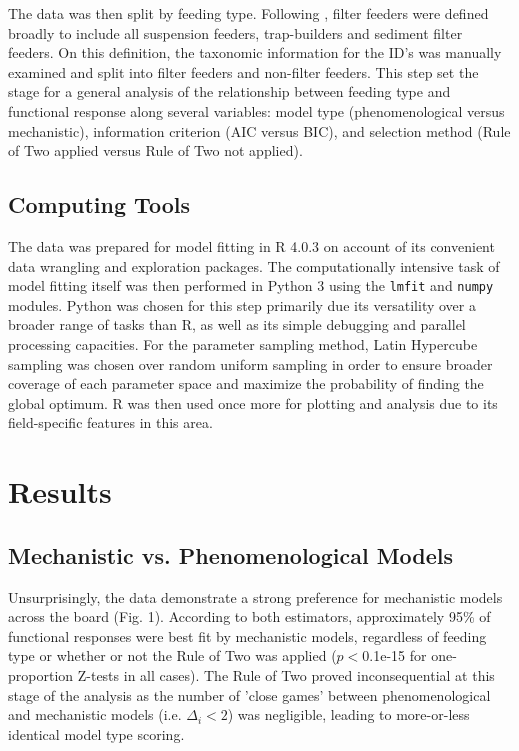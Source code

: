 \documentclass[11pt]{article}
\begin{document}
    The data was then split by feeding type. Following \citet{jeschke2004consumer}, filter feeders were defined broadly to include all suspension feeders, trap-builders and sediment filter feeders. On this definition, the taxonomic information for the ID's was manually examined and split into filter feeders and non-filter feeders. This step set the stage for a general analysis of the relationship between feeding type and functional response along several variables: model type (phenomenological versus mechanistic), information criterion (AIC versus BIC), and selection method (Rule of Two applied versus Rule of Two not applied). 
    
    \subsection{Computing Tools}
    
    The data was prepared for model fitting in R 4.0.3 on account of its convenient data wrangling and exploration packages. The computationally intensive task of model fitting itself was then performed in Python 3 using the \texttt{lmfit} and \texttt{numpy} modules. Python was chosen for this step primarily due its versatility over a broader range of tasks than R, as well as its simple debugging and parallel processing capacities. For the parameter sampling method, Latin Hypercube sampling was chosen over random uniform sampling in order to ensure broader coverage of each parameter space and maximize the probability of finding the global optimum. 
    R was then used once more for plotting and analysis due to its field-specific features in this area.

    
    \section{Results}
    \subsection{Mechanistic vs. Phenomenological Models}
    
    Unsurprisingly, the data demonstrate a strong preference for mechanistic models across the board (Fig. 1). According to both estimators, approximately 95\% of functional responses were best fit by mechanistic models, regardless of feeding type or whether or not the Rule of Two was applied ($p<$0.1e-15 for one-proportion Z-tests in all cases). The Rule of Two proved inconsequential at this stage of the analysis as the number of 'close games' between phenomenological and mechanistic models (i.e. $\Delta_i<2$) was negligible, leading to more-or-less identical model type scoring.
    
\end{document}
